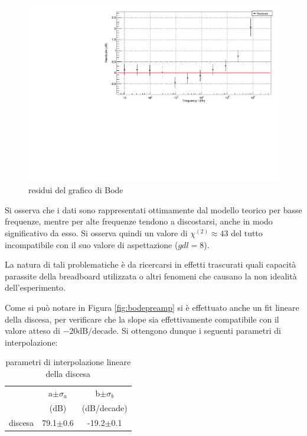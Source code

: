 \documentclass{article}
\begin{document}
\begin{center}
    \begin{figure}[H]
    \centering
    \includegraphics[scale=0.4, angle=0]{bodepreampresidui.pdf}
    \caption{residui del grafico di Bode}
    \label{fig:bodepreamp_res}
    \end{figure}
\end{center}

Si osserva che i dati sono rappresentati ottimamente dal modello teorico per basse
frequenze, mentre per alte frequenze tendono a discostarsi, anche in modo 
significativo da esso. Si osserva quindi un valore di $\chi^{(2)} \approx 43$ del tutto 
incompatibile con il suo valore di aspettazione ($gdl = 8$). 

La natura di tali problematiche è da ricercarsi in effetti trascurati quali capacità parassite della breadboard utilizzata o
altri fenomeni che causano la non idealità dell'esperimento.

Come si può notare in Figura \ref{fig:bodepreamp} si è effettuato anche un
fit lineare della discesa, per verificare che la slope sia effettivamente
compatibile con il valore atteso di $-20 \text{dB}/\text{decade}$. Si ottengono
dunque i seguenti parametri di interpolazione:

\begin{table}[ht]
    \centering
    \begin{tabular}{rcccc}
        \toprule
                &\multicolumn{2}{c}{a$\pm \sigma_a$} &\multicolumn{2}{c}{b$\pm \sigma_b$}\\
                &\multicolumn{2}{c}{(dB)}  &\multicolumn{2}{c}{(dB/decade)}\\
        \midrule
        discesa &\multicolumn{2}{c}{79.1$\pm$0.6}&\multicolumn{2}{c}{-19.2$\pm$0.1}\\
        \bottomrule
    \end{tabular}
    \caption{parametri di interpolazione lineare della discesa}
\end{table}
\end{document}
